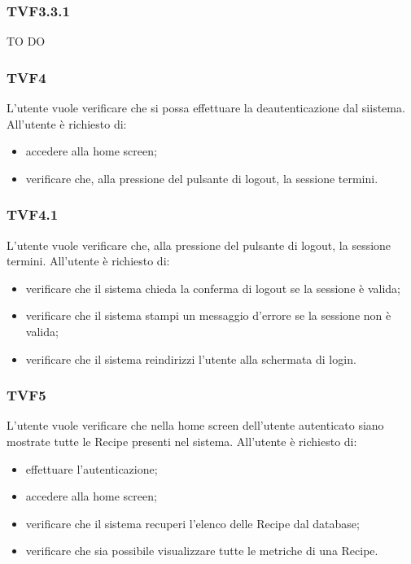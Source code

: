 		\subsubsection{TVF3.3.1}
			TO DO
			
		\subsubsection{TVF4}
			L'utente vuole verificare che si possa effettuare la deautenticazione dal siistema. All'utente è richiesto di:
			\begin{itemize}
				\item accedere alla home screen;
				\item verificare che, alla pressione del pulsante di logout, la sessione termini.
			\end{itemize}
			
		\subsubsection{TVF4.1}
			L'utente vuole verificare che, alla pressione del pulsante di logout, la sessione termini. All'utente è richiesto di:
			\begin{itemize}
				\item verificare che il sistema chieda la conferma di logout se la sessione è valida;
				\item verificare che il sistema stampi un messaggio d'errore se la sessione non è valida;
				\item verificare che il sistema reindirizzi l'utente alla schermata di login.
			\end{itemize}
			
		\subsubsection{TVF5}
			L'utente vuole verificare che nella home screen dell'utente autenticato siano mostrate tutte le Recipe presenti nel sistema. All'utente è richiesto di:
			\begin{itemize}
				\item effettuare l'autenticazione;
				\item accedere alla home screen;
				\item verificare che il sistema recuperi l'elenco delle Recipe dal database;
				\item verificare che sia possibile visualizzare tutte le metriche di una Recipe.
			\end{itemize}
			
